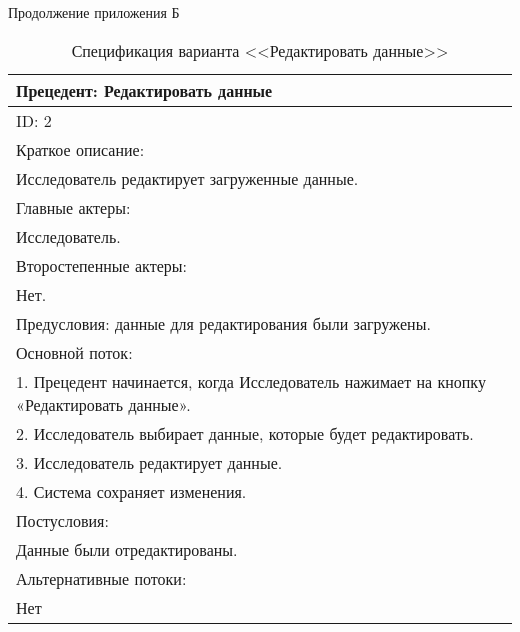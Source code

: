 \newpage
\begin{flushright}
Продолжение приложения Б 
\end{flushright}
\vspace{-1.5em}
\begin{table}[h]
    \caption{Спецификация варианта <<Редактировать данные>>}
    \vspace{1em}
    \begin{tabular}{|p{\textwidth}|}
       \hline
        Прецедент: Редактировать данные\\ \hline
        ID: 2\\ \hline
        Краткое описание: \\ Исследователь редактирует загруженные данные.\\ \hline
        Главные актеры: \\ Исследователь.\\ \hline
        Второстепенные актеры: \\ Нет.\\ \hline
        Предусловия: данные для редактирования были загружены.\\ \hline
        Основной поток:\\
        1. Прецедент начинается, когда Исследователь нажимает на кнопку «Редактировать данные».\\
        2. Исследователь выбирает данные, которые будет редактировать.\\
        3. Исследователь редактирует данные.\\
        4. Система сохраняет изменения.
        \\ \hline
        Постусловия:\\ Данные были отредактированы. \\ \hline
        Альтернативные потоки:\\ Нет \\ \hline
    \end{tabular} 
    \label{tab:Razmetka}
\end{table}
\vspace{2em}


